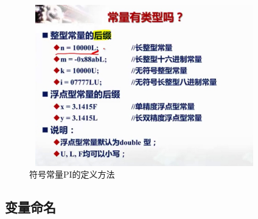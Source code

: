 \documentclass[UTF8]{article}
\begin{document}
\begin{figure}[!htb]
\centering
\includegraphics[width=10cm,height=7cm]{changliangtype.jpg}
\caption{符号常量PI的定义方法}
\hspace{0.05in}
\end{figure}
\subsection{变量命名}
\end{document}
